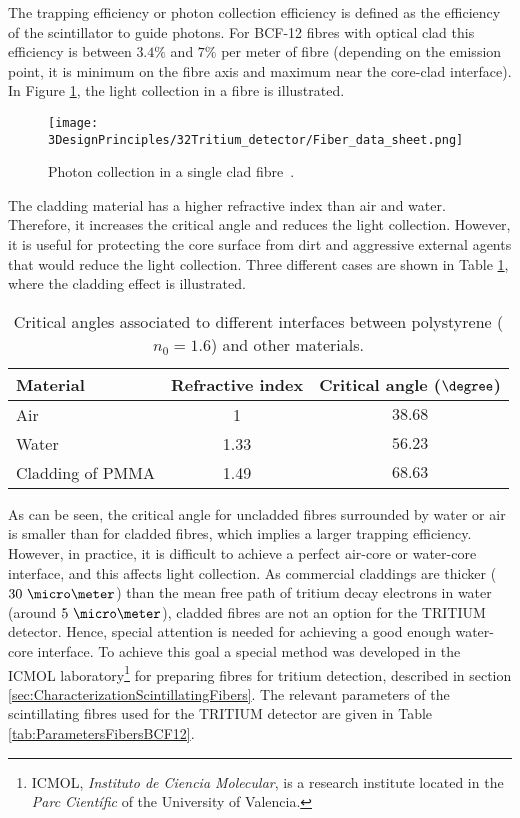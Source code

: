 The trapping efficiency or photon collection efficiency is defined as the efficiency of the scintillator to guide photons. For BCF-12 fibres with optical clad this efficiency is between $3.4\%$ and $7\%$ per meter of fibre (depending on the emission point, it is minimum on the fibre axis and maximum near the core-clad interface). In Figure \ref{fig:Fiber_physic}, the light collection in a fibre is illustrated.


\begin{figure}[htbp]
\centering
\texttt{[image: 3DesignPrinciples/32Tritium\_detector/Fiber\_data\_sheet.png]}
\caption{Photon collection in a single clad fibre\label{fig:Fiber_physic}~\cite{DataSheetBCF12Fiber}.}
\end{figure}
The cladding material has a higher refractive index than air and water. Therefore, it increases the critical angle and reduces the light collection. However, it is useful for protecting the core surface from dirt and aggressive external agents that would reduce the light collection. Three different cases are shown in Table \ref{tab:CriticalAngles}, where the cladding effect is illustrated.
\begin{table}[t]
\centering{}%
\begin{tabular}{lcc}
\toprule 
Material & Refractive index & Critical angle ($\degree$) \tabularnewline
\midrule
\midrule 
Air & 1 & $38.68$ \tabularnewline
Water & 1.33 & $56.23$ \tabularnewline
Cladding of PMMA & 1.49 & $68.63$ \tabularnewline
\bottomrule
\end{tabular}
\caption{Critical angles associated to different interfaces between polystyrene ($n_0=1.6$) and other materials.}
\label{tab:CriticalAngles}
\end{table}
As can be seen, the critical angle for uncladded fibres surrounded by water or air is smaller than for cladded fibres, which implies a larger trapping efficiency. However, in practice, it is difficult to achieve a perfect air-core or water-core interface, and this affects light collection. As commercial claddings are thicker ($30~\micro \meter$) than the mean free path of tritium decay electrons in water (around $5~\micro\meter$), cladded fibres are not an option for the TRITIUM detector. Hence, special attention is needed for achieving a good enough water-core interface. To achieve this goal a special method was developed in the ICMOL laboratory\footnote{ICMOL, \textit{Instituto de Ciencia Molecular}, is a research institute located in the \textit{Parc Científic} of the University of Valencia.} for preparing fibres for tritium detection, described in section \ref{sec:CharacterizationScintillatingFibers}. The relevant parameters of the scintillating fibres used for the TRITIUM detector are given in Table \ref{tab:ParametersFibersBCF12}.

